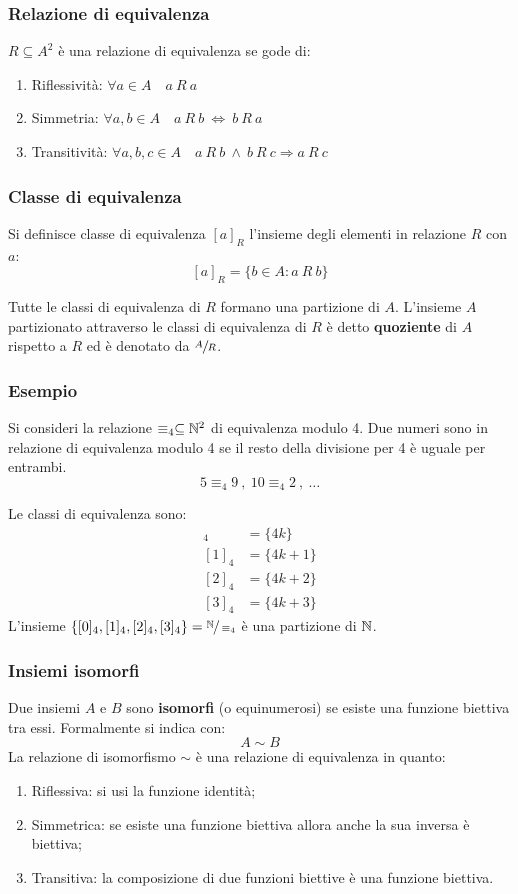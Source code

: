 \subsubsection{Relazione di equivalenza}
$R\subseteq A^2$ è una relazione di equivalenza se gode di:
\begin{enumerate}
    \item Riflessività: $\forall a \in A \quad a \ R \ a$
    \item Simmetria: $\forall a,b \in A \quad a \ R \ b \ \Leftrightarrow \ b \ R \ a$
    \item Transitività: $\forall a,b,c \in A \quad a \ R \ b
    \ \wedge \ b \ R \ c \Rightarrow a \ R \ c $
\end{enumerate}

\subsubsection{Classe di equivalenza}
Si definisce classe di equivalenza $[a]_R$ l'insieme degli elementi in relazione $R$
con $a$:
$$ [a]_R =\{b\in A: a \ R \ b\} $$

Tutte le classi di equivalenza di $R$ formano una partizione di $A$. L'insieme $A$
partizionato attraverso le classi di equivalenza di $R$ è detto \textbf{quoziente}
di $A$ rispetto a $R$ ed è denotato da $\sfrac{A}{R}$.

\subsubsection*{Esempio}
Si consideri la relazione $\equiv_4\subseteq\mathbb{N}^2$ di equivalenza modulo 4. Due numeri
sono in relazione di equivalenza modulo 4 se il resto della divisione per 4 è uguale
per entrambi.
$$ 5\equiv_4 9\ , \ 10\equiv_4 2 \ , \ \dots $$

Le classi di equivalenza sono:
\begin{align}
    [0]_4&=\{4k\}\tag{Multipli di 4}\\
    [1]_4&=\{4k+1\}\tag{Resto 1}\\
    [2]_4&=\{4k+2\}\tag{Resto 2}\\
    [3]_4&=\{4k+3\}\tag{Resto 3}
\end{align}
L'insieme $\{[0]_4,[1]_4,[2]_4,[3]_4\}=\sfrac{\mathbb{N}}{\equiv_4}$ è una partizione di $\mathbb{N}$.

\subsubsection{Insiemi isomorfi}
Due insiemi $A$ e $B$ sono \textbf{isomorfi} (o equinumerosi) se esiste una funzione
biettiva tra essi. Formalmente si indica con:
$$ A\sim B $$
La relazione di isomorfismo $\sim$ è una relazione di equivalenza in quanto:
\begin{enumerate}
    \item Riflessiva: si usi la funzione identità;
    \item Simmetrica: se esiste una funzione biettiva allora anche la sua inversa
        è biettiva;
    \item Transitiva: la composizione di due funzioni biettive è una funzione biettiva.
\end{enumerate}

